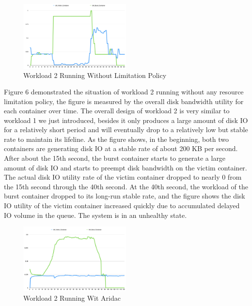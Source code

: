 \documentclass[10pt, conference,compsoc]{IEEEtran}
\begin{document}
\begin{figure}[h]
\centering
\includegraphics[width=0.5\textwidth]{images/workload2_1.png}
\caption{Workload 2 Running Without Limitation Policy}
\end{figure}


Figure 6 demonstrated the situation of workload 2 running without any resource limitation policy, the figure is measured by the overall disk bandwidth utility for each container over time. The overall design of workload 2 is very similar to workload 1 we just introduced, besides it only produces a large amount of disk IO for a relatively short period and will eventually drop to a relatively low but stable rate to maintain its lifeline. As the figure shows, in the beginning, both two containers are generating disk IO at a stable rate of about 200 KB per second. After about the 15th second, the burst container starts to generate a large amount of disk IO and starts to preempt disk bandwidth on the victim container. The actual disk IO utility rate of the victim container dropped to nearly 0 from the 15th second through the 40th second. At the 40th second, the workload of the burst container dropped to its long-run stable rate, and the figure shows the disk IO utility of the victim container increased quickly due to accumulated delayed IO volume in the queue. The system is in an unhealthy state.\\

\begin{figure}[h]
\centering
\includegraphics[width=0.5\textwidth]{images/workload2_2.png}
\caption{Workload 2 Running Wit Aridac}
\end{figure}
\end{document}
